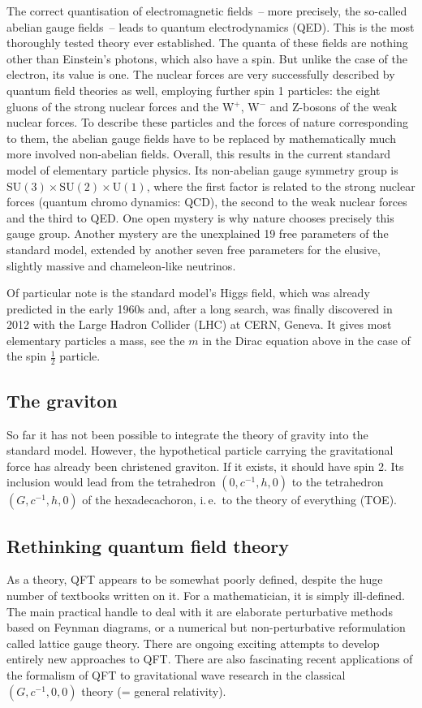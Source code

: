 The correct quantisation of electromagnetic fields~-- more precisely, the so-called abelian gauge fields~-- leads to quantum electrodynamics (QED). This is the most thoroughly tested theory ever established. The quanta of these fields are nothing other than Einstein's photons, which also have a spin. But unlike the case of the electron, its value is one. The nuclear forces are very successfully described by quantum field theories as well, employing further spin 1 particles: the eight gluons of the strong nuclear forces and the W$^+$, W$^-$ and Z-bosons of the weak nuclear forces. To describe these particles and the forces of nature corresponding to them, the abelian gauge fields have to be replaced by mathematically much more involved non-abelian fields. Overall, this results in the current standard model of elementary particle physics. Its non-abelian gauge symmetry group is $\mathrm{SU}(3) \times \mathrm{SU}(2) \times \mathrm{U}(1)$, where the first factor is related to the strong nuclear forces (quantum chromo dynamics: QCD), the second to the weak nuclear forces and the third to QED. One open mystery is why nature chooses precisely this gauge group. Another mystery are the unexplained 19 free parameters of the standard model, extended by another seven free parameters for the elusive, slightly massive and chameleon-like neutrinos.

Of particular note is the standard model's Higgs field, which was already predicted in the early 1960s and, after a long search, was finally discovered in 2012 with the Large Hadron Collider (LHC) at CERN, Geneva. It gives most elementary particles a mass, see the $m$ in the Dirac equation above in the case of the spin $\frac12$ particle.


\subsection*{The graviton}

So far it has not been possible to integrate the theory of gravity into the standard model. However, the hypothetical particle carrying the gravitational force has already been christened graviton. If it exists, it should have spin 2. Its inclusion would lead from the tetrahedron $(0, c^{-1},h,0)$ to the tetrahedron $(G,c^{-1},h,0)$ of the hexadecachoron, i.\,e.\ to the theory of everything (TOE).


\subsection*{Rethinking quantum field theory}

As a theory, QFT appears to be somewhat poorly defined, despite the huge number of textbooks written on it. For a mathematician, it is simply ill-defined. The main practical handle to deal with it are elaborate perturbative methods based on Feynman diagrams, or a numerical but non-perturbative reformulation called lattice gauge theory. There are ongoing exciting attempts to develop entirely new approaches to QFT. There are also fascinating recent applications of the formalism of QFT to gravitational wave research in the classical $(G,c^{-1},0,0)$ theory (= general relativity).

